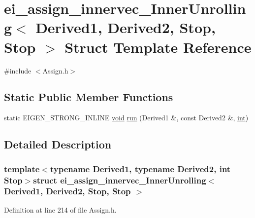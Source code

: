 \hypertarget{structei__assign__innervec___inner_unrolling_3_01_derived1_00_01_derived2_00_01_stop_00_01_stop_01_4}{\section{ei\-\_\-assign\-\_\-innervec\-\_\-\-Inner\-Unrolling$<$ Derived1, Derived2, Stop, Stop $>$ Struct Template Reference}
\label{structei__assign__innervec___inner_unrolling_3_01_derived1_00_01_derived2_00_01_stop_00_01_stop_01_4}
}


{\ttfamily \#include $<$Assign.\-h$>$}

\subsection*{Static Public Member Functions}
\begin{DoxyCompactItemize}
\item 
static E\-I\-G\-E\-N\-\_\-\-S\-T\-R\-O\-N\-G\-\_\-\-I\-N\-L\-I\-N\-E \hyperlink{group___u_a_v_objects_plugin_ga444cf2ff3f0ecbe028adce838d373f5c}{void} \hyperlink{structei__assign__innervec___inner_unrolling_3_01_derived1_00_01_derived2_00_01_stop_00_01_stop_01_4_a926a7e04c6320e7974d5aca6d9139662}{run} (Derived1 \&, const Derived2 \&, \hyperlink{ioapi_8h_a787fa3cf048117ba7123753c1e74fcd6}{int})
\end{DoxyCompactItemize}


\subsection{Detailed Description}
\subsubsection*{template$<$typename Derived1, typename Derived2, int Stop$>$struct ei\-\_\-assign\-\_\-innervec\-\_\-\-Inner\-Unrolling$<$ Derived1, Derived2, Stop, Stop $>$}



Definition at line 214 of file Assign.\-h.



